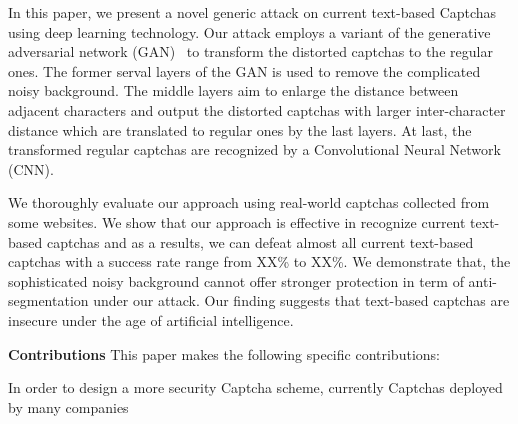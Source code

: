 In this paper, we present a novel generic attack on current text-based Captchas using deep learning technology. Our attack employs a variant of the generative adversarial network (GAN)~\cite{pix2pix2016} to transform the distorted captchas to the regular ones. The former serval layers of the GAN is used to remove the complicated noisy background. The middle layers aim to enlarge the distance between adjacent characters and output the distorted captchas with larger inter-character distance which are translated to regular ones by the last layers. At last, the transformed regular captchas are recognized by a Convolutional Neural Network (CNN).

We thoroughly evaluate our approach using real-world captchas collected from some websites. We show that our approach is effective in recognize current text-based captchas and as a results, we can defeat almost all current text-based captchas with a success rate range from XX\% to XX\%. We demonstrate that, the sophisticated noisy background cannot offer stronger protection in term of anti-segmentation under our attack. Our finding suggests that text-based captchas are insecure under the age of artificial intelligence.

\textbf{Contributions} This paper makes the following specific contributions:



In order to design a more security Captcha scheme, currently Captchas deployed by many companies 